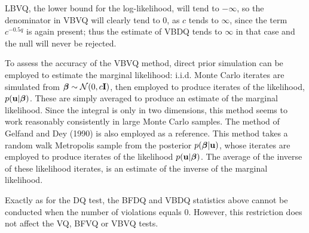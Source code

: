 \documentclass[12pt,epsf]{article}
\newcommand{\utwi}[1]{\mbox{\boldmath $ #1$}}
\begin{document}
LBVQ, the lower bound for the log-likelihood, will tend to $-\infty$, so the denominator in VBVQ will clearly tend to 0,
as $c$ tends to $\infty$, since the term $c^{-0.5q}$ is again present; thus the estimate of VBDQ tends to $\infty$ in that case and
the null will never be rejected.

%

To assess the accuracy of the VBVQ method, direct prior simulation can be employed to estimate the marginal likelihood: i.i.d. Monte Carlo
iterates are simulated from $\bm{\beta} \sim {\mathcal{N}}(0,c \mathbf{I})$, then employed to produce iterates of the likelihood, $p({\bf u}|\utwi{\beta})$.
These are simply averaged to produce an estimate of the marginal likelihood. Since the integral is only in two dimensions, this method
seems to work reasonably consistently in large Monte Carlo samples. The method of Gelfand and Dey (1990) is also employed as
a reference. This method takes a random walk Metropolis sample from the posterior $p(\utwi{\beta} | {\bf u})$, whose
iterates are employed to produce iterates of the likelihood $p({\bf u}|\utwi{\beta})$. The average of the inverse of these likelihood iterates, 
is an estimate of the inverse of the marginal likelihood.

Exactly as for the DQ test, the BFDQ and VBDQ statistics above cannot be conducted when the number of violations equals 0.
However, this restriction does not affect the VQ, BFVQ or VBVQ tests.
\end{document}
